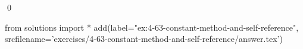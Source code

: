 
\begin{ex}
  \label{ex:4-63-constant-method-and-self-reference}
  
  \qed
\end{ex}
\begin{python0}
from solutions import *
add(label="ex:4-63-constant-method-and-self-reference",
    srcfilename='exercises/4-63-constant-method-and-self-reference/answer.tex')
\end{python0}
